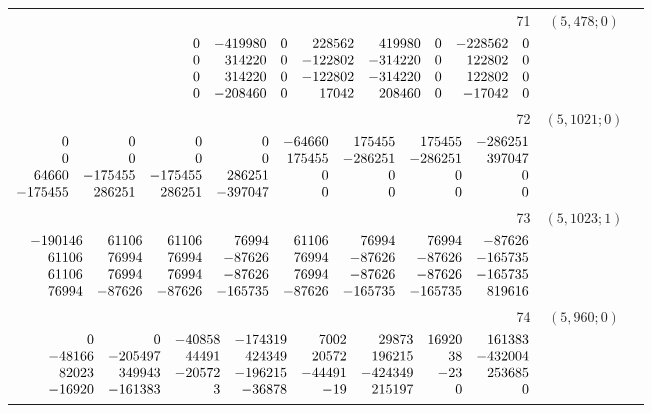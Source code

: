 \documentclass[11pt]{article}
\theoremstyle{remark}
\numberwithin{equation}{section}
\begin{document}
\begin{longtable}{rcl}
71 & $(5,478;0)$ & \begin{tabular}[t]{@{}l@{}}$w_i=\displaystyle \frac{2323334349629557}{16414562146500000000000000000000000}$\\[3pt]{\scriptsize$\begin{array}{@{}rrrrrrrr@{}}0 & -419980 & 0 & 228562 & 419980 & 0 & -228562 & 0\\0 & 314220 & 0 & -122802 & -314220 & 0 & 122802 & 0\\0 & 314220 & 0 & -122802 & -314220 & 0 & 122802 & 0\\0 & -208460 & 0 & 17042 & 208460 & 0 & -17042 & 0\end{array}$}\end{tabular}\\[8pt]
72 & $(5,1021;0)$ & \begin{tabular}[t]{@{}l@{}}$w_i=\displaystyle \frac{3865479434076091}{12283033356272437500000000000000000}$\\[3pt]{\scriptsize$\begin{array}{@{}rrrrrrrr@{}}0 & 0 & 0 & 0 & -64660 & 175455 & 175455 & -286251\\0 & 0 & 0 & 0 & 175455 & -286251 & -286251 & 397047\\64660 & -175455 & -175455 & 286251 & 0 & 0 & 0 & 0\\-175455 & 286251 & 286251 & -397047 & 0 & 0 & 0 & 0\end{array}$}\end{tabular}\\[8pt]
73 & $(5,1023;1)$ & \begin{tabular}[t]{@{}l@{}}$w_i=\displaystyle \frac{491278683697297}{2762886098238000000000000000000000}$\\[3pt]{\scriptsize$\begin{array}{@{}rrrrrrrr@{}}-190146 & 61106 & 61106 & 76994 & 61106 & 76994 & 76994 & -87626\\61106 & 76994 & 76994 & -87626 & 76994 & -87626 & -87626 & -165735\\61106 & 76994 & 76994 & -87626 & 76994 & -87626 & -87626 & -165735\\76994 & -87626 & -87626 & -165735 & -87626 & -165735 & -165735 & 819616\end{array}$}\end{tabular}\\[8pt]
74 & $(5,960;0)$ & \begin{tabular}[t]{@{}l@{}}$w_i=\displaystyle \frac{89599552921041407}{130156161570776911640000000000000000}$\\[3pt]{\scriptsize$\begin{array}{@{}rrrrrrrr@{}}0 & 0 & -40858 & -174319 & 7002 & 29873 & 16920 & 161383\\-48166 & -205497 & 44491 & 424349 & 20572 & 196215 & 38 & -432004\\82023 & 349943 & -20572 & -196215 & -44491 & -424349 & -23 & 253685\\-16920 & -161383 & 3 & -36878 & -19 & 215197 & 0 & 0\end{array}$}\end{tabular}\\[8pt]

\end{longtable}
\end{document}
